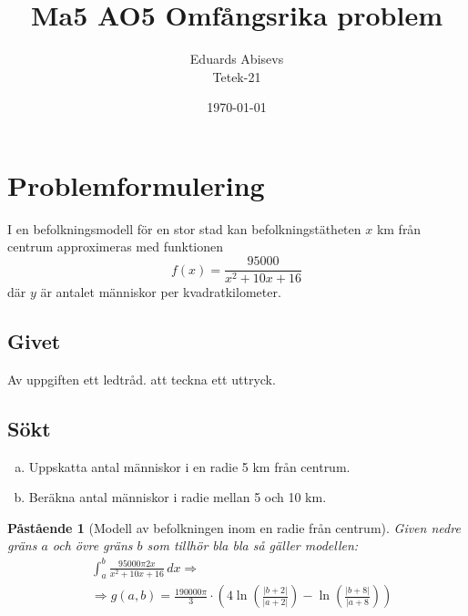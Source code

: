 \documentclass{article}
\title{Ma5 AO5 Omfångsrika problem}
\author{Eduards Abisevs \\ Tetek-21}
\date{\today}
\newtheorem{proposition}{Påstående}
\begin{document}
\maketitle

\section*{Problemformulering}
I en befolkningsmodell för en stor stad kan befolkningstätheten $x$ km från
centrum approximeras med funktionen 
\[
f(x) = \frac{95000}{x^2 + 10x + 16}
\]
där $y$ är antalet människor per kvadratkilometer.

\noindent
\subsection*{Givet}
Av uppgiften ett ledtråd. att teckna ett uttryck.

\noindent
\subsection*{Sökt}
\begin{enumerate}[(a)]
    \item Uppskatta antal människor i en radie 5 km från centrum.
    \item Beräkna antal människor i radie mellan 5 och 10 km.
\end{enumerate}

\begin{proposition}[Modell av befolkningen inom en radie från centrum]
	Given nedre gräns \( a \) och övre gräns \( b \) som tillhör bla bla så gäller modellen: 
	\begin{align*}
		&\int_{a}^{b} \frac{95000 \pi 2 x}{x^2 + 10x + 16} \, dx
		\Rightarrow \\
		&\Rightarrow g(a,b) = \frac{190 000 \pi}{3} \cdot
		\left(4\ln{\left(\frac{|b + 2|}{|a +2|}\right)} 
			-  \ln{\left(\frac{|b + 8|}{|a + 8}\right)} \right)
	\end{align*}
\end{proposition}
\end{document}
